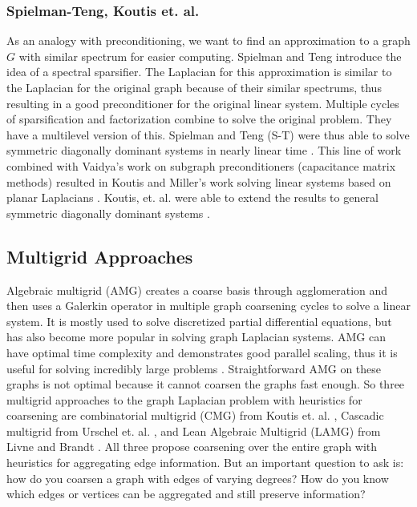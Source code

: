 \documentclass{article}
\begin{document}
\subsubsection{Spielman-Teng, Koutis et. al.}
As an analogy with preconditioning, we want to find an approximation to a graph $G$ with similar spectrum for easier computing. Spielman and Teng introduce the idea of a spectral sparsifier. The Laplacian for this approximation is similar to the Laplacian for the original graph because of their similar spectrums, thus resulting in a good preconditioner for the original linear system. Multiple cycles of sparsification and factorization combine to solve the original problem. They have a multilevel version of this. Spielman and Teng (S-T) were thus able to solve symmetric diagonally dominant systems in nearly linear time \cite{Spielman:2008}.  This line of work combined with Vaidya's \cite{Vaidya:1991} work on subgraph preconditioners (capacitance matrix methods) resulted in Koutis and Miller's work solving linear systems based on planar Laplacians \cite{Koutis:2007}. Koutis, et. al. were able to extend the results to general symmetric diagonally dominant systems \cite{Koutis:2010}.

\subsection{Multigrid Approaches}
Algebraic multigrid (AMG) creates a coarse basis through agglomeration and then uses a Galerkin operator in multiple graph coarsening cycles to solve a linear system. It is mostly used to solve discretized partial differential equations, but has also become more popular in solving graph Laplacian systems. AMG can have optimal time complexity and demonstrates good parallel scaling, thus it is useful for solving incredibly large problems \cite{Livne:2012}. Straightforward AMG on these graphs is not optimal because it cannot coarsen the graphs fast enough. So three multigrid approaches to the graph Laplacian problem with heuristics for coarsening are combinatorial multigrid (CMG) from Koutis et. al. \cite{Koutis:2011}, Cascadic multigrid from Urschel et. al. \cite{Urschel:2014}, and Lean Algebraic Multigrid (LAMG) from Livne and Brandt \cite{Livne:2012}. All three propose coarsening over the entire graph with heuristics for aggregating edge information. But an important question to ask is: how do you coarsen a graph with edges of varying degrees? How do you know which edges or vertices can be aggregated and still preserve information?
\end{document}
